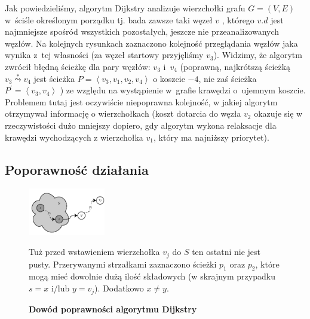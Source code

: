 Jak powiedzieliśmy, algorytm Dijkstry analizuje wierzchołki grafu $G = \left( V, E \right)$ w~ściśle określonym porządku tj. bada zawsze taki węzeł $v$ , którego $v.d$ jest najmniejsze spośród wszystkich pozostałych, jeszcze nie przeanalizowanych węzłów. Na kolejnych rysunkach zaznaczono kolejność przeglądania węzłów jaka wynika z~tej własności (za węzeł startowy przyjęliśmy $v_{3}$). Widzimy, że algorytm zwrócił błędną ścieżkę dla pary węzłów: $v_{3}$ i~$v_{4}$ (poprawną, najkrótszą ścieżką $v_{3} \overset{*}\leadsto v_{4}$ jest ścieżka $ P = \left \langle v_{3}, v_{1}, v_{2}, v_{4} \right \rangle $ o koszcie $-4$, nie zaś ścieżka $ P^{'} = \left \langle v_{3}, v_{4} \right \rangle $ ) ze względu na wystąpienie w~grafie krawędzi o~ujemnym koszcie. Problemem tutaj jest oczywiście niepoprawna kolejność, w jakiej algorytm otrzymywał informację o wierzchołkach (koszt dotarcia do węzła $v_{2}$ okazuje się w rzeczywistości dużo mniejszy dopiero, gdy algorytm wykona relaksacje dla krawędzi wychodzących z wierzchołka $v_{1}$, który ma najniższy priorytet).
\newpage

\subsection{Poporawność działania}

\begin{figure}[!htbp]
	\includegraphics[width=0.3\textwidth]{Chapter_II/ProofOfDijkstra/a.pdf}
	\caption{\textbf{Dowód poprawności algorytmu Dijkstry}} Tuż przed wstawieniem wierzchołka $v_{j}$ do $S$ ten ostatni nie jest pusty. Przerywanymi strzałkami zaznaczono ścieżki $p_{1}$ oraz $p_{2}$, które mogą mieć dowolnie dużą ilość składowych (w skrajnym przypadku $s = x$ i/lub $y = v_{j}$). Dodatkowo $x \neq y$. \label{fig:proofOfDijkstra}
\end{figure}

